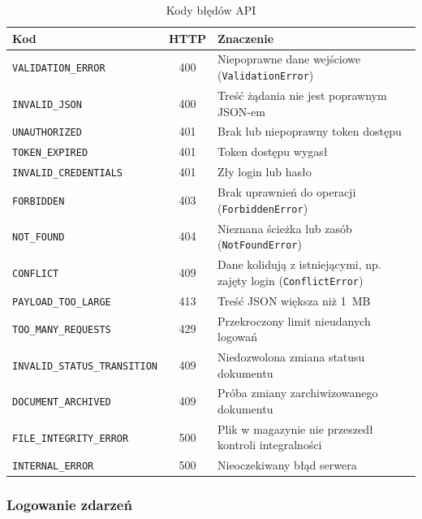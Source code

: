 \begin{table}[htbp]
\centering
\caption{Kody błędów API}
\label{tab:bledy}
\small
\begin{tabular}{|l|c|p{}|}
\hline
\textbf{Kod} & \textbf{HTTP} & \textbf{Znaczenie} \\
\hline
\texttt{VALIDATION\_ERROR} & 400 & Niepoprawne dane wejściowe (\texttt{ValidationError}) \\
\hline
\texttt{INVALID\_JSON} & 400 & Treść żądania nie jest poprawnym JSON-em \\
\hline
\texttt{UNAUTHORIZED} & 401 & Brak lub niepoprawny token dostępu \\
\hline
\texttt{TOKEN\_EXPIRED} & 401 & Token dostępu wygasł \\
\hline
\texttt{INVALID\_CREDENTIALS} & 401 & Zły login lub hasło \\
\hline
\texttt{FORBIDDEN} & 403 & Brak uprawnień do operacji (\texttt{ForbiddenError}) \\
\hline
\texttt{NOT\_FOUND} & 404 & Nieznana ścieżka lub zasób (\texttt{NotFoundError}) \\
\hline
\texttt{CONFLICT} & 409 & Dane kolidują z istniejącymi, np. zajęty login (\texttt{ConflictError}) \\
\hline
\texttt{PAYLOAD\_TOO\_LARGE} & 413 & Treść JSON większa niż 1~MB \\
\hline
\texttt{TOO\_MANY\_REQUESTS} & 429 & Przekroczony limit nieudanych logowań \\
\hline
\texttt{INVALID\_STATUS\_TRANSITION} & 409 & Niedozwolona zmiana statusu dokumentu \\
\hline
\texttt{DOCUMENT\_ARCHIVED} & 409 & Próba zmiany zarchiwizowanego dokumentu \\
\hline
\texttt{FILE\_INTEGRITY\_ERROR} & 500 & Plik w magazynie nie przeszedł kontroli integralności \\
\hline
\texttt{INTERNAL\_ERROR} & 500 & Nieoczekiwany błąd serwera \\
\hline
\end{tabular}
\par
{}
\end{table}

\subsubsection{Logowanie zdarzeń}

